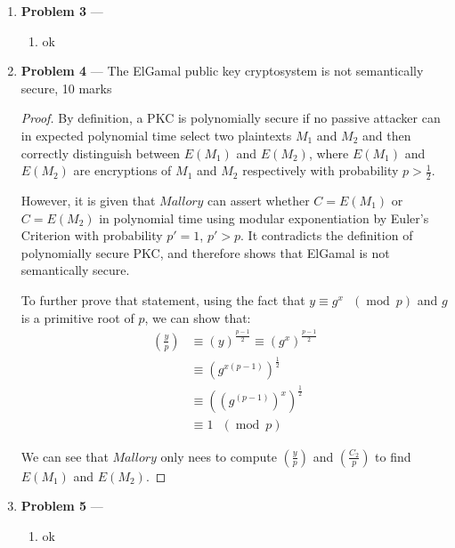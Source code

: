 \documentclass[11pt]{article}
\theoremstyle{definition}
\renewcommand{\pmod}[1]{\mbox{\ $(\ensuremath{\operatorname{mod}}\ {#1})$}}
\providecommand{\Leg}[2]{\genfrac{(}{)}{}{}{#1}{#2}}
\newcommand{\M}{Mallory}
\begin{document}
\begin{enumerate}
\newpage

\item[] \textbf{Problem 3} --- 

\begin{enumerate}
  \item ok
\end{enumerate}

\newpage

\item[] \textbf{Problem 4} --- The ElGamal public key cryptosystem is not semantically secure, 10 marks

\begin{proof}
  By definition, a PKC is polynomially secure if no passive attacker can in expected polynomial time select two plaintexts $M_1$ and $M_2$ and then correctly distinguish between $E(M_1)$ and $E(M_2)$, where $E(M_1)$ and $E(M_2)$ are encryptions of $M_1$ and $M_2$ respectively with probability $p > \frac{1}{2}$.

  However, it is given that $\M$ can assert whether $C = E(M_1)$ or $C = E(M_2)$ in polynomial time using modular exponentiation by Euler's Criterion with probability $p' = 1$, $p' > p$. It contradicts the definition of polynomially secure PKC, and therefore shows that ElGamal is not semantically secure.
  
  To further prove that statement, using the fact that $y \equiv g^x \pmod{p}$ and $g$ is a primitive root of $p$, we can show that:
  \begin{align*}
    \Leg{y}{p} &\equiv (y)^{\frac{p - 1}{2}} \equiv (g^x)^{\frac{p - 1}{2}} \\
               &\equiv (g^{x(p - 1)})^{\frac{1}{2}} \\
               &\equiv ((g^{(p - 1)})^x)^{\frac{1}{2}} \\
               &\equiv 1 \pmod{p}
  \end{align*}

  We can see that $\M$ only nees to compute $\Leg{y}{p}$ and $\Leg{C_2}{p}$ to find $E(M_1)$ and $E(M_2)$. 
\end{proof}

\newpage

\item[] \textbf{Problem 5} --- 

\begin{enumerate}
  \item ok
\end{enumerate}

\newpage

\end{enumerate}
\end{document}
